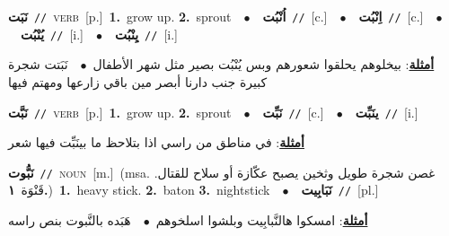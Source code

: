 \documentclass[10pt,a4paper,twoside]{article} %
\begin{document}
\begin{multicols}{2}
{\setlength\topsep{0pt}\textbf{\foreignlanguage{arabic}{نَبَت}}\ {\color{gray}\texttt{//}\color{black}}\ \textsc{verb}\ [p.]\ \textbf{1.}~grow up.  \textbf{2.}~sprout\ \ $\bullet$\ \ \setlength\topsep{0pt}\textbf{\foreignlanguage{arabic}{اُنْبُت}}\ {\color{gray}\texttt{//}\color{black}}\ [c.]\ \ $\bullet$\ \ \setlength\topsep{0pt}\textbf{\foreignlanguage{arabic}{اِنْبُت}}\ {\color{gray}\texttt{//}\color{black}}\ [c.]\ \ $\bullet$\ \ \setlength\topsep{0pt}\textbf{\foreignlanguage{arabic}{يُنْبُت}}\ {\color{gray}\texttt{//}\color{black}}\ [i.]\ \ $\bullet$\ \ \setlength\topsep{0pt}\textbf{\foreignlanguage{arabic}{يِنْبُت}}\ {\color{gray}\texttt{//}\color{black}}\ [i.]\  \begin{flushright}\color{gray}\foreignlanguage{arabic}{\textbf{\underline{\foreignlanguage{arabic}{أمثلة}}}: بيخلوهم يحلقوا شعورهم وبس يُنْبُت بصير مثل شهر الأطفال\ $\bullet$\ \  نَبَتت شجرة كبيرة جنب دارنا أبصر مين باقي زارعها ومهتم فيها}\end{flushright}\color{black}} \vspace{2mm}

{\setlength\topsep{0pt}\textbf{\foreignlanguage{arabic}{نَبَّت}}\ {\color{gray}\texttt{//}\color{black}}\ \textsc{verb}\ [p.]\ \textbf{1.}~grow up.  \textbf{2.}~sprout\ \ $\bullet$\ \ \setlength\topsep{0pt}\textbf{\foreignlanguage{arabic}{نَبِّت}}\ {\color{gray}\texttt{//}\color{black}}\ [c.]\ \ $\bullet$\ \ \setlength\topsep{0pt}\textbf{\foreignlanguage{arabic}{ينَبِّت}}\ {\color{gray}\texttt{//}\color{black}}\ [i.]\  \begin{flushright}\color{gray}\foreignlanguage{arabic}{\textbf{\underline{\foreignlanguage{arabic}{أمثلة}}}: في مناطق من راسي اذا بتلاحظ ما بينَبِّت فيها شعر}\end{flushright}\color{black}} \vspace{2mm}

{\setlength\topsep{0pt}\textbf{\foreignlanguage{arabic}{نَبُّوت}}\ {\color{gray}\texttt{//}\color{black}}\ \textsc{noun}\ [m.]\ \color{gray}(msa. \foreignlanguage{arabic}{غصن شجرة طويل وثخين يصبح عكّازة أو سلاح للقتال. قَنْوَة}~\foreignlanguage{arabic}{\textbf{١.}})\color{black}\ \textbf{1.}~heavy stick.  \textbf{2.}~baton  \textbf{3.}~nightstick\ \ $\bullet$\ \ \setlength\topsep{0pt}\textbf{\foreignlanguage{arabic}{نَبَابِيت}}\ {\color{gray}\texttt{//}\color{black}}\ [pl.]\  \begin{flushright}\color{gray}\foreignlanguage{arabic}{\textbf{\underline{\foreignlanguage{arabic}{أمثلة}}}: امسكوا هالنَّبابِيت وبلشوا اسلخوهم\ $\bullet$\ \  هَبَده بالنَّبوت بنص راسه}\end{flushright}\color{black}} \vspace{2mm}


\end{multicols}
\end{document}
